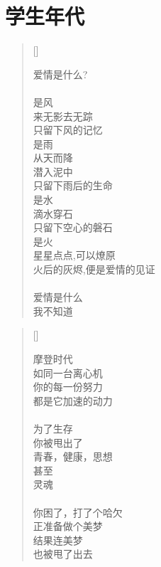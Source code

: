 \chapter{学生年代}
\thispagestyle{empty}
\renewcommand{\poemtoc}{section}
\settowidth{\versewidth}{只留下风的记忆}
\setlength{\vgap}{1em}
\begin{verse}[\versewidth]

爱情是什么?\\
~\\
是风\\
\vin 来无影去无踪\\
\vin 只留下风的记忆\\
是雨\\
\vin  从天而降\\
\vin  潜入泥中\\
\vin  只留下雨后的生命\\
是水\\
\vin  滴水穿石\\
\vin  只留下空心的磐石\\
是火\\
\vin  星星点点,可以燎原\\
\vin  火后的灰烬,便是爱情的见证\\
~\\
爱情是什么\\
我不知道\\
\end{verse}
\newpage

\renewcommand{\poemtoc}{section}
\settowidth{\versewidth}{你的每一份努力}
\begin{verse}[\versewidth]

摩登时代\\
如同一台离心机\\
你的每一份努力\\
都是它加速的动力\\
~\\
为了生存\\
你被甩出了\\
\vin   青春，健康，思想\\
甚至\\
\vin   灵魂\\
~\\
你困了，打了个哈欠\\
正准备做个美梦\\
结果连美梦\\
也被甩了出去
\end{verse}

